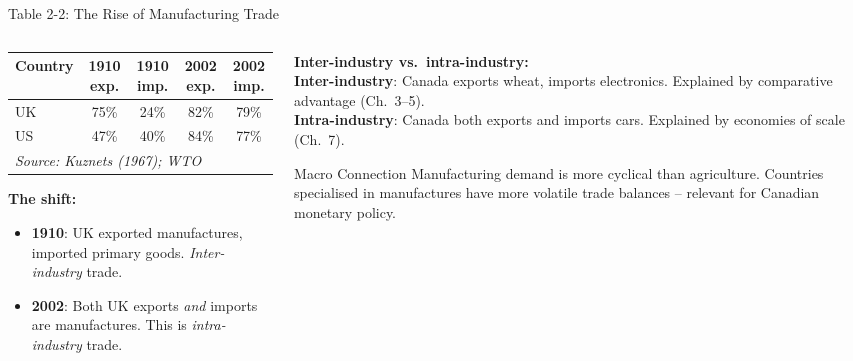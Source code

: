 \documentclass[aspectratio=169]{beamer}
\begin{document}
\begin{frame}{Table 2-2: The Rise of Manufacturing Trade}
\begin{columns}[T]
\begin{column}{0.50\textwidth}
\begin{center}
\begin{adjustbox}{max width=\columnwidth}
\begin{tabular}{lcccc}
\toprule
\textbf{Country} & \textbf{1910 exp.} & \textbf{1910 imp.} & \textbf{2002 exp.} & \textbf{2002 imp.}\\
\midrule
UK & 75\% & 24\% & 82\% & 79\%\\
US & 47\% & 40\% & 84\% & 77\%\\
\bottomrule
\multicolumn{5}{l}{\scriptsize\textit{Source: Kuznets (1967); WTO}}
\end{tabular}
\end{adjustbox}
\end{center}
\vspace{0.3em}
\textbf{The shift:}
\begin{itemize}\small
  \item \textbf{1910}: UK exported manufactures, imported primary goods. \emph{Inter-industry} trade.
  \item \textbf{2002}: Both UK exports \emph{and} imports are manufactures. This is \emph{intra-industry} trade.
\end{itemize}
\end{column}
\begin{column}{0.47\textwidth}
\begin{varbox}
\footnotesize\textbf{Inter-industry vs.\ intra-industry:}\\[0.25em]
\textbf{Inter-industry}: Canada exports wheat, imports electronics. Explained by comparative advantage (Ch.~3--5).\\[0.3em]
\textbf{Intra-industry}: Canada both exports and imports cars. Explained by economies of scale (Ch.~7).
\end{varbox}
\vspace{0.3em}
\begin{insight}{Macro Connection}
\footnotesize Manufacturing demand is more cyclical than agriculture. Countries specialised in manufactures have more volatile trade balances -- relevant for Canadian monetary policy.
\end{insight}
\end{column}
\end{columns}
\end{frame}
\end{document}
